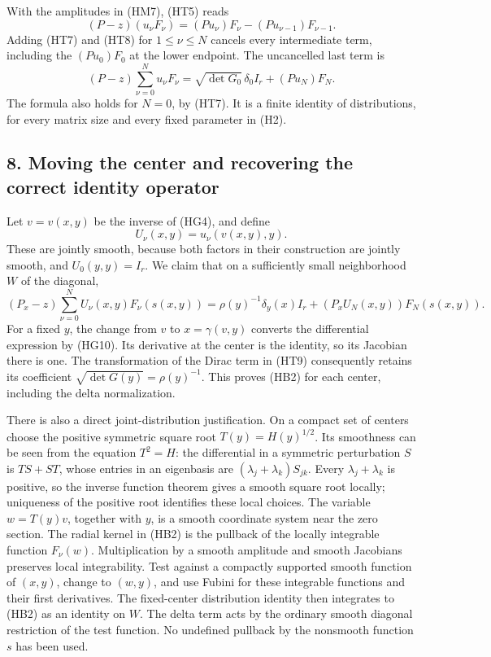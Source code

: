 \documentclass[
  11pt,
]{article}
\begin{document}
With the amplitudes in (HM7), (HT5) reads \[
       (P-z)(u_\nu F_\nu)
                 =(Pu_\nu)F_\nu-(Pu_{\nu-1})F_{\nu-1}.
                                                               \tag{HT8}
\] Adding (HT7) and (HT8) for \(1\leq\nu\leq N\) cancels every
intermediate term, including the \((Pu_0)F_0\) at the lower endpoint.
The uncancelled last term is \[
 (P-z)\sum_{\nu=0}^{N}u_\nu F_\nu
       =\sqrt{\det G_0}\,\delta_0I_r+(Pu_N)F_N.                \tag{HT9}
\] The formula also holds for \(N=0\), by (HT7). It is a finite identity
of distributions, for every matrix size and every fixed parameter in
(H2).

\subsection{8. Moving the center and recovering the correct identity
operator}\label{moving-the-center-and-recovering-the-correct-identity-operator}

Let \(v=v(x,y)\) be the inverse of (HG4), and define \[
                    U_\nu(x,y)=u_\nu(v(x,y),y).                \tag{HB1}
\] These are jointly smooth, because both factors in their construction
are jointly smooth, and \(U_0(y,y)=I_r\). We claim that on a
sufficiently small neighborhood \(W\) of the diagonal, \[
 (P_x-z)\sum_{\nu=0}^{N}U_\nu(x,y)F_\nu(s(x,y))
       =\rho(y)^{-1}\delta_y(x)I_r
                    +(P_xU_N(x,y))F_N(s(x,y)).                \tag{HB2}
\] For a fixed \(y\), the change from \(v\) to \(x=\gamma(v,y)\)
converts the differential expression by (HG10). Its derivative at the
center is the identity, so its Jacobian there is one. The transformation
of the Dirac term in (HT9) consequently retains its coefficient
\(\sqrt{\det G(y)}=\rho(y)^{-1}\). This proves (HB2) for each center,
including the delta normalization.

There is also a direct joint-distribution justification. On a compact
set of centers choose the positive symmetric square root
\(T(y)=H(y)^{1/2}\). Its smoothness can be seen from the equation
\(T^2=H\): the differential in a symmetric perturbation \(S\) is
\(TS+ST\), whose entries in an eigenbasis are
\((\lambda_j+\lambda_k)S_{jk}\). Every \(\lambda_j+\lambda_k\) is
positive, so the inverse function theorem gives a smooth square root
locally; uniqueness of the positive root identifies these local choices.
The variable \(w=T(y)v\), together with \(y\), is a smooth coordinate
system near the zero section. The radial kernel in (HB2) is the pullback
of the locally integrable function \(F_\nu(w)\). Multiplication by a
smooth amplitude and smooth Jacobians preserves local integrability.
Test against a compactly supported smooth function of \((x,y)\), change
to \((w,y)\), and use Fubini for these integrable functions and their
first derivatives. The fixed-center distribution identity then
integrates to (HB2) as an identity on \(W\). The delta term acts by the
ordinary smooth diagonal restriction of the test function. No undefined
pullback by the nonsmooth function \(s\) has been used.
\end{document}
